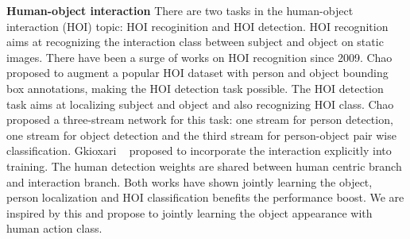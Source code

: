 \textbf{Human-object interaction}
There are two tasks in the human-object interaction (HOI) topic: HOI recoginition and HOI detection. HOI recognition aims at recognizing the interaction class between subject and object on static images. There have been a surge of works \cite{delaitre2010recognizing,gupta2009observing,yao2010modeling} on HOI recognition since 2009. Chao \etal~\cite{chao2018learning} proposed to augment a popular HOI dataset \cite{chao2015hico} with person and object bounding box annotations, making the HOI detection task possible. The HOI detection task aims at localizing subject and object and also recognizing HOI class. Chao \etal~\cite{chao2018learning} proposed a three-stream network for this task: one stream for person detection, one stream for object detection and the third stream for person-object pair wise classification. Gkioxari \etal~\cite{gkioxari2017detecting} proposed to incorporate the interaction explicitly into training. The human detection weights are shared between human centric branch and interaction branch. Both works have shown jointly learning the object, person localization and HOI classification benefits the performance boost. We are inspired by this and propose to jointly learning the object appearance with human action class.



